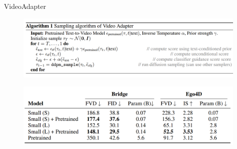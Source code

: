 \begin{frame}[allowframebreaks]{VideoAdapter}
\framebreak
\begin{figure}
    \centering
    \includegraphics[width=\linewidth,height=\textheight,keepaspectratio]{images/adv-img-gen/slide_165_1_img.png}
\end{figure}

\framebreak
\begin{figure}
    \centering
    \includegraphics[width=\linewidth,height=\textheight,keepaspectratio]{images/adv-img-gen/slide_166_1_img.png}
\end{figure}


\end{frame}
